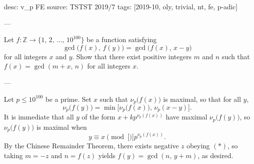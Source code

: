 desc: v_p FE
source: TSTST 2019/7
tags: [2019-10, oly, trivial, nt, fe, p-adic]

---

Let $f:\mathbb Z\to\{1,\,2,\,\ldots,\,10^{100}\}$ be a function satisfying \[\gcd\big(f(x),\,f(y)\big)=\gcd\big(f(x),\,x-y\big)\]
for all integers $x$ and $y$. Show that there exist positive integers $m$ and $n$ such that $f(x)=\gcd(m+x,\,n)$ for all integers $x$.

---

Let $p\le 10^{100}$ be a prime. Set $x$ such that $\nu_p\big(f(x)\big)$ is maximal, so that for all $y$, \[\nu_p\big(f(y)\big)=\min\big[\nu_p\big(f(x)\big),\,\nu_p(x-y)\big].\]
It is immediate that all $y$ of the form $x+kp^{\nu_p(f(x))}$ have maximal $\nu_p\big(f(y)\big)$, so $\nu_p\big(f(y)\big)$ is maximal when
\begin{equation}
    y\equiv x\pmod[\Big]{p^{\nu_p(f(x))}}.\tag{$*$}
\end{equation}
By the Chinese Remainder Theorem, there exists negative $z$ obeying $(*)$, so taking $m=-z$ and $n=f(z)$ yields $f(y)=\gcd(n,\,y+m)$, as desired.
